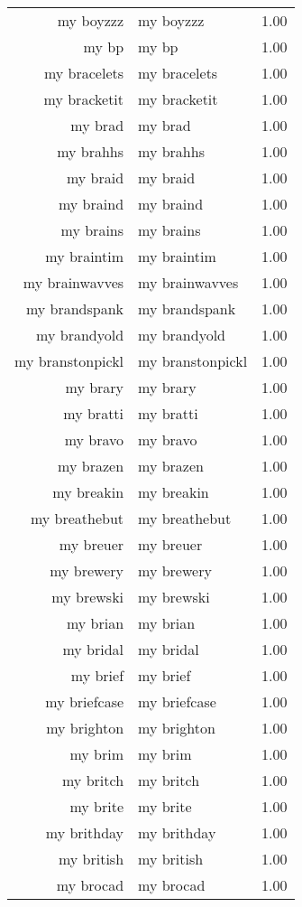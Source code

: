 \begin{table}[ht]
\begin{tabular}{rlr}
  my boyzzz & my boyzzz & 1.00 \\ 
  my bp & my bp & 1.00 \\ 
  my bracelets & my bracelets & 1.00 \\ 
  my bracketit & my bracketit & 1.00 \\ 
  my brad & my brad & 1.00 \\ 
  my brahhs & my brahhs & 1.00 \\ 
  my braid & my braid & 1.00 \\ 
  my braind & my braind & 1.00 \\ 
  my brains & my brains & 1.00 \\ 
  my braintim & my braintim & 1.00 \\ 
  my brainwavves & my brainwavves & 1.00 \\ 
  my brandspank & my brandspank & 1.00 \\ 
  my brandyold & my brandyold & 1.00 \\ 
  my branstonpickl & my branstonpickl & 1.00 \\ 
  my brary & my brary & 1.00 \\ 
  my bratti & my bratti & 1.00 \\ 
  my bravo & my bravo & 1.00 \\ 
  my brazen & my brazen & 1.00 \\ 
  my breakin & my breakin & 1.00 \\ 
  my breathebut & my breathebut & 1.00 \\ 
  my breuer & my breuer & 1.00 \\ 
  my brewery & my brewery & 1.00 \\ 
  my brewski & my brewski & 1.00 \\ 
  my brian & my brian & 1.00 \\ 
  my bridal & my bridal & 1.00 \\ 
  my brief & my brief & 1.00 \\ 
  my briefcase & my briefcase & 1.00 \\ 
  my brighton & my brighton & 1.00 \\ 
  my brim & my brim & 1.00 \\ 
  my britch & my britch & 1.00 \\ 
  my brite & my brite & 1.00 \\ 
  my brithday & my brithday & 1.00 \\ 
  my british & my british & 1.00 \\ 
  my brocad & my brocad & 1.00 \\ 

\end{tabular}
\end{table}
